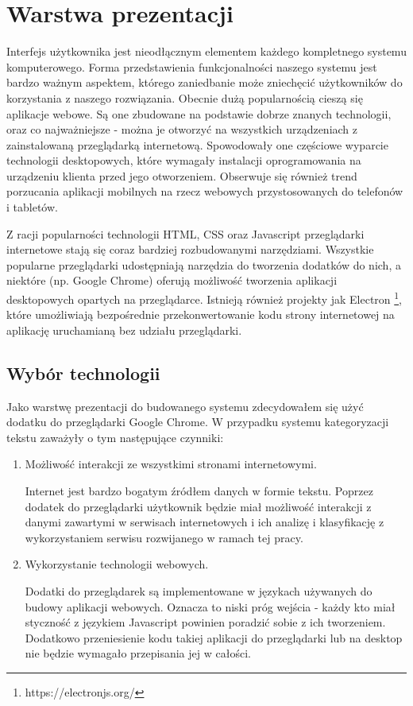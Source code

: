 \newpage
\section{Warstwa prezentacji}

Interfejs użytkownika jest nieodłącznym elementem każdego kompletnego systemu komputerowego. Forma przedstawienia funkcjonalności naszego systemu jest bardzo ważnym aspektem, którego zaniedbanie może zniechęcić użytkowników do korzystania z naszego rozwiązania. Obecnie dużą popularnością cieszą się aplikacje webowe. Są one zbudowane na podstawie dobrze znanych technologii, oraz co najważniejsze - można je otworzyć na wszystkich urządzeniach z zainstalowaną przeglądarką internetową. Spowodowały one częściowe wyparcie technologii desktopowych, które wymagały instalacji oprogramowania na urządzeniu klienta przed jego otworzeniem. Obserwuje się również trend porzucania aplikacji mobilnych na rzecz webowych przystosowanych do telefonów i tabletów.

Z racji popularności technologii HTML, CSS oraz Javascript przeglądarki internetowe stają się coraz bardziej rozbudowanymi narzędziami. Wszystkie popularne przeglądarki udostępniają narzędzia do tworzenia dodatków do nich, a niektóre (np. Google Chrome) oferują możliwość tworzenia aplikacji desktopowych opartych na przeglądarce. Istnieją również projekty jak Electron \footnote{https://electronjs.org/}, które umożliwiają bezpośrednie przekonwertowanie kodu strony internetowej na aplikację uruchamianą bez udziału przeglądarki.

\subsection{Wybór technologii}

Jako warstwę prezentacji do budowanego systemu zdecydowałem się użyć dodatku do przeglądarki Google Chrome. W przypadku systemu kategoryzacji tekstu zaważyły o tym następujące czynniki:
\begin{enumerate}
    \item Możliwość interakcji ze wszystkimi stronami internetowymi.
    
    Internet jest bardzo bogatym źródłem danych w formie tekstu. Poprzez dodatek do przeglądarki użytkownik będzie miał możliwość interakcji z danymi zawartymi w serwisach internetowych i ich analizę i klasyfikację z wykorzystaniem serwisu rozwijanego w ramach tej pracy.
    
    \item Wykorzystanie technologii webowych.
    
    Dodatki do przeglądarek są implementowane w językach używanych do budowy aplikacji webowych. Oznacza to niski próg wejścia - każdy kto miał styczność z językiem Javascript powinien poradzić sobie z ich tworzeniem. Dodatkowo przeniesienie kodu takiej aplikacji do przeglądarki lub na desktop nie będzie wymagało przepisania jej w całości.
\end{enumerate}

